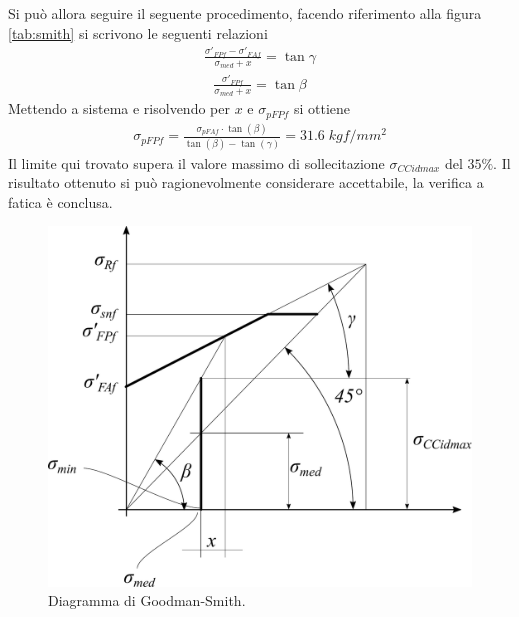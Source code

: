 Si può allora seguire il seguente procedimento, facendo riferimento alla figura \ref{tab:smith} si scrivono le seguenti relazioni
\begin{align*}
\frac{\sigma'_{FPf} - \sigma'_{FAf}}{\sigma_{med}+x} = \tan \gamma
\end{align*}
\begin{align*}
\frac{\sigma'_{FPf}}{\sigma_{med}+x} = \tan \beta
\end{align*}
Mettendo a sistema e risolvendo per $x$ e $\sigma_{pFPf}$ si ottiene
\begin{align*}
\sigma_{pFPf} = \frac{\sigma_{pFAf} \cdot \tan (\beta)}{\tan (\beta) - \tan (\gamma)} = 31.6 \; kgf/mm^2
\end{align*}
Il limite qui trovato supera il valore massimo di sollecitazione $\sigma_{CCidmax}$ del $35\%$. Il risultato ottenuto si può ragionevolmente considerare accettabile, la verifica a fatica è conclusa.
\begin{figure}[H]
\centering
  \includegraphics[width=.6\textwidth]{imgs/Smith}
\caption{Diagramma di Goodman-Smith.}
\label{fig:Smith}
\end{figure}
 
